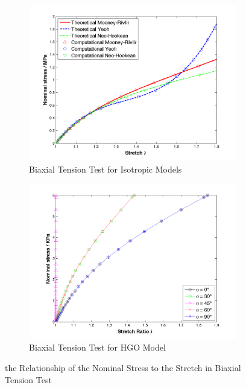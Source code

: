 \begin{figure}[H]
	\centering
	\begin{subfigure}[b]{0.45\textwidth}
		\centering
		\includegraphics[width=\textwidth]{./figures/biaxial1.png}
		\caption{Biaxial Tension Test for Isotropic Models}
		\label{fig:biaxial1}
	\end{subfigure}
	\begin{subfigure}[b]{0.45\textwidth}
		\centering
		\includegraphics[width=\textwidth]{./figures/biaxial2.png}
		\caption{Biaxial Tension Test for HGO Model}
		\label{fig:biaxial2}
	\end{subfigure}
	\caption{the Relationship of the Nominal Stress to the Stretch in Biaxial Tension Test}
\end{figure}


